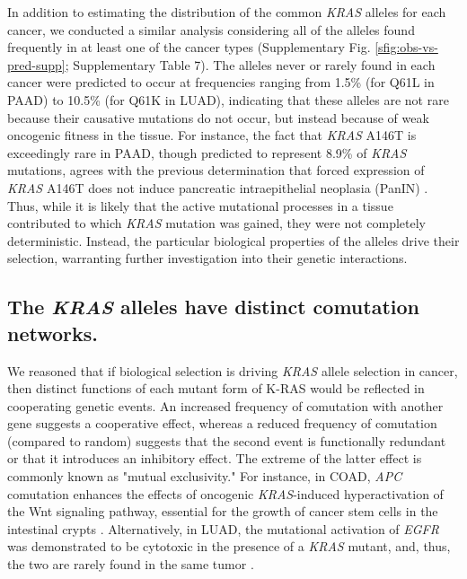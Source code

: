 \documentclass[english, 10pt, letterpaper]{article}
\newcommand{\KRAS}{\emph{KRAS}}
\newcommand{\kras}{K-RAS}
\begin{document}
In addition to estimating the distribution of the common \KRAS{} alleles for each cancer, we conducted a similar analysis considering all of the alleles found frequently in at least one of the cancer types (Supplementary Fig. \ref{sfig:obs-vs-pred-supp}; Supplementary Table 7).
The alleles never or rarely found in each cancer were predicted to occur at frequencies ranging from 1.5\% (for Q61L in PAAD) to 10.5\% (for Q61K in LUAD), indicating that these alleles are not rare because their causative mutations do not occur, but instead because of weak oncogenic fitness in the tissue.
For instance, the fact that \KRAS{} A146T is exceedingly rare in PAAD, though predicted to represent 8.9\% of \KRAS{} mutations, agrees with the previous determination that forced expression of \KRAS{} A146T does not induce pancreatic intraepithelial neoplasia (PanIN) \cite{Poulin2019}.
Thus, while it is likely that the active mutational processes in a tissue contributed to which \KRAS{} mutation was gained, they were not completely deterministic.
Instead, the particular biological properties of the alleles drive their selection, warranting further investigation into their genetic interactions.


\subsection*{The \KRAS{} alleles have distinct comutation networks.}

We reasoned that if biological selection is driving \KRAS{} allele selection in cancer, then distinct functions of each mutant form of \kras{} would be reflected in cooperating genetic events. 
An increased frequency of comutation with another gene suggests a cooperative effect, whereas a reduced frequency of comutation (compared to random) suggests that the second event is functionally redundant or that it introduces an inhibitory effect.
The extreme of the latter effect is commonly known as "mutual exclusivity."
For instance, in COAD, \emph{APC} comutation enhances the effects of oncogenic \KRAS{}-induced hyperactivation of the Wnt signaling pathway, essential for the growth of cancer stem cells in the intestinal crypts \cite{Janssen2006, Fearon2014, Sakai2018, Jauhri2017}.
Alternatively, in LUAD, the mutational activation of \emph{EGFR} was demonstrated to be cytotoxic in the presence of a \KRAS{} mutant, and, thus, the two are rarely found in the same tumor \cite{Unni2015EvidenceAdenocarcinoma., Ambrogio2017InAdenocarcinoma.}.
\end{document}
